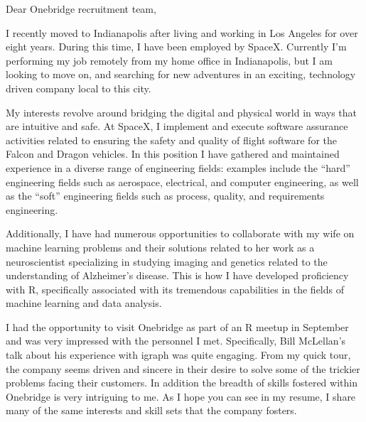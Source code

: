 \begin{cvletter}


Dear Onebridge recruitment team,

I recently moved to Indianapolis after living and working in Los Angeles for
over eight years. During this time, I have been employed by SpaceX. Currently
I'm performing my job remotely from my home office in Indianapolis, but I am
looking to move on, and searching for new adventures in an exciting, technology
driven company local to this city.

My interests revolve around bridging the digital and physical world in ways that
are intuitive and safe. At SpaceX, I implement and execute software assurance
activities related to ensuring the safety and quality of flight software for the
Falcon and Dragon vehicles. In this position I have gathered and maintained
experience in a diverse range of engineering fields: examples include the
``hard'' engineering fields such as aerospace, electrical, and computer
engineering, as well as the ``soft'' engineering fields such as process,
quality, and requirements engineering.

Additionally, I have had numerous opportunities to collaborate with my wife on
machine learning problems and their solutions related to her work as a
neuroscientist specializing in studying imaging and genetics related to the
understanding of Alzheimer's disease. This is how I have developed proficiency
with R, specifically associated with its tremendous capabilities in the fields
of machine learning and data analysis.




I had the opportunity to visit Onebridge as part of an R meetup in September and
was very impressed with the personnel I met. Specifically, Bill McLellan's talk
about his experience with igraph was quite engaging. From my quick tour, the
company seems driven and sincere in their desire to solve some of the trickier
problems facing their customers. In addition the breadth of skills fostered
within Onebridge is very intriguing to me. As I hope you can see in my resume, I
share many of the same interests and skill sets that the company fosters.




\end{cvletter}
